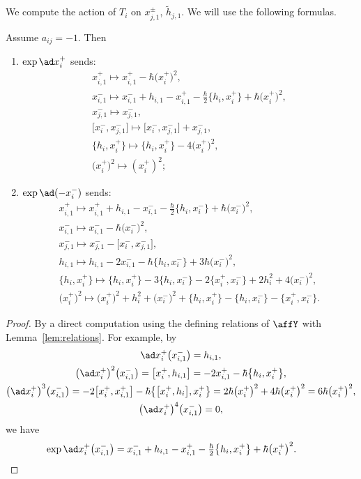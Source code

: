 We compute the action of $T_i$ on $x_{j,1}^{\pm}$, $\tilde{h}_{j,1}$. We will use the following formulas.
\begin{lem}\label{lem:expad2}Assume $a_{ij}=-1$. Then
\begin{enumerate}\itemsep=0pt
\item $\exp\ad x_{i}^{+}$ sends:
\begin{gather*}
x_{i,1}^+ \mapsto x_{i,1}^+-\hbar \big(x_i^+\big)^2,\\
x_{i,1}^- \mapsto x_{i,1}^- + h_{i,1}-x_{i,1}^+ -\tfrac{\hbar}{2}\big\{ h_i, x_i^+\big\} + \hbar \big(x_i^+\big)^2,\\
x_{j,1}^- \mapsto x_{j,1}^-,\\
\big[x_i^-,x_{j,1}^-\big] \mapsto \big[x_i^-,x_{j,1}^-\big]+x_{j,1}^-,\\
\big\{h_i,x_i^+\big\} \mapsto \big\{h_i,x_i^+\big\} - 4\big(x_i^+\big)^2,\\
\big(x_i^+\big)^2 \mapsto (x_i^+)^2;
\end{gather*}
\item $\exp\ad (-x_{i}^{-})$ sends:
\begin{gather*}
x_{i,1}^+ \mapsto x_{i,1}^+ + h_{i,1}-x_{i,1}^- -\tfrac{\hbar}{2}\big\{ h_i, x_i^-\big\} + \hbar \big(x_i^-\big)^2,\\
x_{i,1}^- \mapsto x_{i,1}^- - \hbar\big(x_i^-\big)^2,\\
x_{j,1}^- \mapsto x_{j,1}^- - \big[x_i^-,x_{j,1}^-\big],\\
h_{i,1} \mapsto h_{i,1} - 2x_{i,1}^- - \hbar\big\{ h_i, x_i^- \big\} + 3\hbar \big(x_i^-\big)^2,\\
\big\{h_i,x_i^+\big\} \mapsto \big\{h_i,x_i^+\big\} - 3\big\{h_i,x_i^-\big\} - 2\big\{x_i^+,x_i^-\big\} + 2h_i^2 + 4\big(x_i^-\big)^2,\\
\big(x_i^+\big)^2 \mapsto \big(x_i^+\big)^2 + h_i^2 + \big(x_i^-\big)^2+ \big\{h_i,x_i^+\big\} - \big\{h_i,x_i^-\big\} - \big\{x_i^+,x_i^-\big\}.
\end{gather*}
\end{enumerate}
\end{lem}
\begin{proof}By a direct computation using the defining relations of $\affY$ with Lemma~\ref{lem:relations}. For example, by
\begin{gather*}
\ad x_i^{+} \big(x_{i,1}^-\big) = h_{i,1}, \\
\big(\ad x_i^{+}\big)^2 \big(x_{i,1}^-\big) = \big[x_i^+,h_{i,1}\big] = -2x_{i,1}^+ - \hbar \big\{h_i,x_i^+\big\}, \\
\big(\ad x_i^{+}\big)^3 \big(x_{i,1}^-\big) = -2 \big[x_i^+, x_{i,1}^+\big] - \hbar \big\{\big[x_i^+,h_i\big],x_i^+\big\} = 2\hbar\big(x_i^+\big)^2 + 4\hbar \big(x_i^+\big)^2 = 6\hbar\big(x_i^+\big)^2, \\
\big(\ad x_i^{+}\big)^4 \big(x_{i,1}^-\big)=0,
\end{gather*}
we have
\begin{gather*}
\exp\ad x_i^+ \big(x_{i,1}^-\big) = x_{i,1}^- + h_{i,1} - x_{i,1}^+ - \tfrac{\hbar}{2} \big\{h_i,x_i^+\big\} + \hbar\big(x_i^+\big)^2.\tag*{\qed}
\end{gather*}\renewcommand{\qed}{}
\end{proof}


